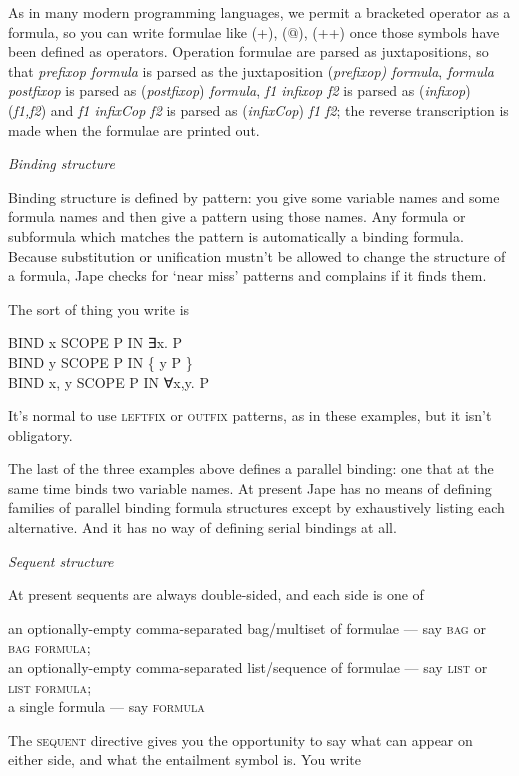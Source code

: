 As in many modern programming languages, we permit a bracketed operator as a formula, so you can write formulae like (+), (\ensuremath{@}), (++) once those symbols have been defined as operators. Operation formulae are parsed as juxtapositions, so that \textit{prefixop formula} is parsed as the juxtaposition (\textit{prefixop) formula}, \textit{formula postfixop} is parsed as (\textit{postfixop}) \textit{formula}, \textit{f1 infixop f2} is parsed as (\textit{infixop}) (\textit{f1,f2}) and \textit{f1 infixCop f2} is parsed as (\textit{infixCop}) \textit{f1 f2}; the reverse transcription is made when the formulae are printed out.


\textit{Binding structure}


Binding structure is defined by pattern: you give some variable names and some formula names and then give a pattern using those names. Any formula or subformula which matches the pattern is automatically a binding formula. Because substitution or unification mustn't be allowed to change the structure of a formula, Jape checks for `near miss' patterns and complains if it finds them.


The sort of thing you write is

BIND x SCOPE P IN ∃x. P\\
BIND y SCOPE P IN \{ y {\textbar} P \}\\
BIND x, y SCOPE P IN ∀x,y. P


It's normal to use \textsc{leftfix} or \textsc{outfix} patterns, as in these examples, but it isn't obligatory.


The last of the three examples above defines a parallel binding: one that at the same time binds two variable names. At present Jape has no means of defining families of parallel binding formula structures except by exhaustively listing each alternative. And it has no way of defining serial bindings at all.


\textit{Sequent structure}


At present sequents are always double-sided, and each side is one of


{\textbullet}\tab an optionally-empty comma-separated bag/multiset of formulae --- say \textsc{bag} or \textsc{bag formula};\\
{\textbullet}\tab an optionally-empty comma-separated list/sequence of formulae --- say \textsc{list} or \textsc{list formula};\\
{\textbullet}\tab a single formula --- say \textsc{formula}


The \textsc{sequent} directive gives you the opportunity to say what can appear on either side, and what the entailment symbol is. You write


